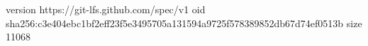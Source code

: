 version https://git-lfs.github.com/spec/v1
oid sha256:c3e404ebc1bf2eff23f5e3495705a131594a9725f578389852db67d74ef0513b
size 11068
